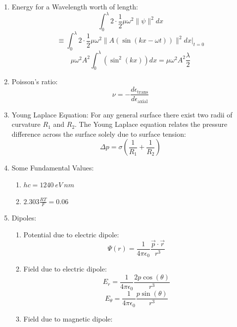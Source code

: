 \documentclass{article}
\numberwithin{equation}{section}
\numberwithin{figure}{section}
\begin{document}
\begin{enumerate}
	\item Energy for a Wavelength worth of length: 
\begin{equation}
 \int_{0}^{\lambda}2\cdot\frac{1}{2}\mu \omega^2\|\psi\|^2 dx
\end{equation}
\begin{equation}
\equiv  \int_{0}^{\lambda}2\cdot\frac{1}{2}\mu \omega^2\| A(\sin(kx-\omega t))\|^2 dx\bigg |_{t=0} 
\end{equation}
\begin{equation}
	\mu \omega^2 A^2 \int_{0}^{\lambda}(\sin^2(kx))dx=\boxed{\mu \omega^2 A^2 \frac{\lambda}{2}} 
\end{equation}
\item Poisson's ratio:
\begin{equation}
	\nu=-\frac{d \epsilon_{\text{trans}}}{d\epsilon_{\text{axial}}}	
\end{equation}
	\item Young Laplace Equation:
		For any general surface there exist two radii of curvature $R_1$ and $R_2$. The Young Laplace equation relates the pressure difference across the surface solely due to surface tension:
\begin{equation}
	\Delta p= \sigma \left(\frac{1}{R_1}+\frac{1}{R_2}\right)
\end{equation}
	\item Some Fundamental Values:
		\begin{enumerate}
			\item $hc=1240 \ eV \ nm $
			\item $2.303 \frac{RT}{F}=0.06$
		\end{enumerate}
	\item Dipoles:
		\begin{enumerate}
			\item Potential due to electric dipole:
				\begin{equation}\Psi(r)=\frac{1}{4\pi\epsilon_0}\frac{\vec{p}\cdot\vec{r} }{r^3}\end{equation}
			\item Field due to electric dipole:
				\begin{equation}
					E_{r}=\frac{1}{4\pi\epsilon_0}\frac{2p\cos(\theta)}{r^3}
				\end{equation}
				\begin{equation}
					E_{\theta}=\frac{1}{4\pi\epsilon_0}\frac{p\sin(\theta)}{r^3}
				\end{equation}
			\item Field due to magnetic dipole:
				\begin{equation}

\end{equation}
\end{enumerate}
\end{enumerate}
\end{document}
